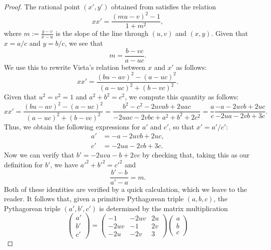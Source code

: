 \begin{proof}
  The rational point $(x',y')$ obtained from  satisfies the relation
  \begin{equation*}
    xx' = \frac{(mu-v)^2 -1}{1+m^2},
  \end{equation*}
  where $m:=\tfrac{y-v}{x-u}$ is the slope of the line through $(u,v)$ and $(x,y)$. Given that $x=a/c$ and $y=b/c$, we see that
  \begin{equation*}
    m=\frac{b-vc}{a-uc}.
  \end{equation*}
  We use this to rewrite Vieta's relation between $x$ and $x'$ as follows:
  \begin{equation*}
    xx' = \frac{(bu-av)^2-(a-uc)^2}{(a-uc)^2+(b-vc)^2}.
  \end{equation*}
  Given that $u^2=v^2=1$ and $a^2+b^2=c^2$, we compute this quantity as follows:
  \begin{equation*}
    xx'= \frac{(bu-av)^2-(a-uc)^2}{(a-uc)^2+(b-vc)^2} = \frac{b^2-c^2-2uvab+2uac}{-2uac-2vbc + a^2+b^2+2c^2}=\frac{a}{c}\frac{-a-2uvb+2uc}{-2ua-2vb + 3c}.
  \end{equation*}
  Thus, we obtain the following expressions for $a'$ and $c'$, so that $x'=a'/c'$:
  \begin{align*}
    a' & = -a-2uvb+2uc, \\
    c' & = -2ua-2vb + 3c.
  \end{align*}
  Now we can verify that $b'=-2uva-b+2vc$ by checking that, taking this as our definition for $b'$, we have $a'^2+b'^2=c'^2$ and
  \begin{equation*}
    \frac{b'-b}{a'-a}=m.
  \end{equation*}
  Both of these identities are verified by a quick calculation, which we leave to the reader. It follows that, given a primitive Pythagorean triple $(a,b,c)$, the Pythagorean triple $(a',b',c')$ is determined by the matrix multiplication
  \begin{equation*}
    \begin{pmatrix}
      a' \\
      b' \\
      c'
    \end{pmatrix}
    =
    \begin{pmatrix}
      -1 & -2uv & 2u \\
      -2uv & -1 & 2v \\
      -2u & -2v & 3
    \end{pmatrix}
    \begin{pmatrix}
      a \\
      b \\
      c
    \end{pmatrix}
  \end{equation*}
  

\end{proof}
